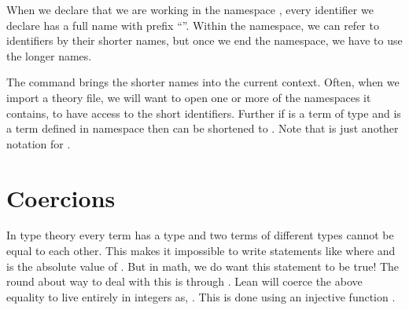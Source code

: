 \documentclass[letterpaper,10pt,english]{sphinxmanual}
\begin{document}
\def\sphinxLiteralBlockLabel{\label{\detokenize{day5:namespace-example}}}
\begin{sphinxVerbatim}[commandchars=\\\{\}]
 
     
   
 

   
 
 

 

  
 
\end{sphinxVerbatim}

\sphinxAtStartPar
When we declare that we are working in the namespace , every identifier we declare has a full name with prefix “”.
Within the namespace, we can refer to identifiers by their shorter names, but once we end the namespace, we have to use the longer names.

\sphinxAtStartPar
The  command brings the shorter names into the current context. Often, when we import a theory file, we will want to open one or more of the namespaces it contains, to have access to the short identifiers.
Further if  is a term of type  and  is a term defined in namespace  then  can be shortened to .
Note that  is just another notation for .


\section{Coercions}
\label{\detokenize{day5:coercions}}
\sphinxAtStartPar
In type theory every term has a type and two terms of different types cannot be equal to each other.
This makes it impossible to write statements like  where  and  is the absolute value of .
But in math, we do want this statement to be true!
The round about way to deal with this is through .
Lean will coerce the above equality to live entirely in integers as, .
This is done using an injective function .
\end{document}
